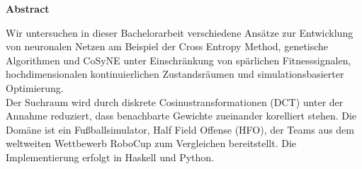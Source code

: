 %
%
\vspace*{2cm}

\begin{center}
    \textbf{Abstract}
\end{center}

\vspace*{1cm}

\noindent Wir untersuchen in dieser Bachelorarbeit verschiedene Ansätze zur Entwicklung von neuronalen Netzen am Beispiel der Cross Entropy Method, genetische Algorithmen und CoSyNE unter Einschränkung von spärlichen Fitnesssignalen, hochdimensionalen kontinuierlichen Zustandsräumen und simulationsbasierter Optimierung. \\
Der Suchraum wird durch diskrete Cosinustransformationen (DCT) unter der Annahme reduziert, dass benachbarte Gewichte zueinander korelliert stehen. Die Domäne ist ein Fußballsimulator, Half Field Offense (HFO), der Teams aus dem weltweiten Wettbewerb RoboCup zum Vergleichen bereitstellt. Die Implementierung erfolgt in Haskell und Python. 